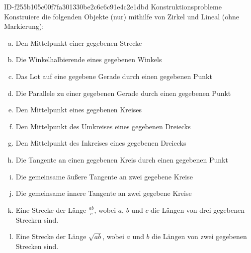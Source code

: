 \begin{exercise}
      {ID-f255b105c00f7fa301330be2c6c6c91e4c2e1dbd}
      {Konstruktionsprobleme}
  \ifproblem\problem
    Konstruiere die folgenden Objekte (nur) mithilfe von Zirkel und Lineal (ohne Markierung):
    \begin{enumerate}[a)]
      \item Den Mittelpunkt einer gegebenen Strecke
      \item Die Winkelhalbierende eines gegebenen Winkels
      \item Das Lot auf eine gegebene Gerade durch einen gegebenen Punkt
      \item Die Parallele zu einer gegebenen Gerade durch einen gegebenen Punkt
      \item Den Mittelpunkt eines gegebenen Kreises
      \item Den Mittelpunkt des Umkreises eines gegebenen Dreiecks
      \item Den Mittelpunkt des Inkreises eines gegebenen Dreiecks
      \item Die Tangente an einen gegebenen Kreis durch einen gegebenen Punkt
      \item Die gemeinsame äußere Tangente an zwei gegebene Kreise
      \item Die gemeinsame innere Tangente an zwei gegebene Kreise
      \item Eine Strecke der Länge $\frac{ab}{c}$, wobei $a$, $b$ und $c$
            die Längen von drei gegebenen Strecken sind.
      \item Eine Strecke der Länge $\sqrt{ab}$, wobei $a$ und $b$
            die Längen von zwei gegebenen Strecken sind.
    \end{enumerate}
  \fi
\end{exercise}
